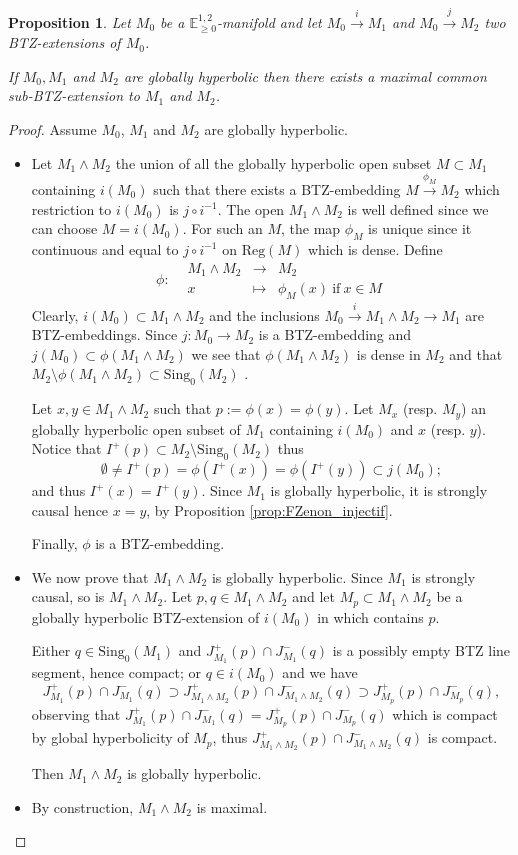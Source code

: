 \documentclass[a4paper,12pt]{article}
\def\sing{\mathrm{Sing}}
\newcommand{\mass}[1]{{\mathbb E}^{1,2}_{#1}}
\def\Reg{\mathrm{Reg}}
\def\pgcd{M_1\wedge M_2}
\def\reg{\Reg}
\newcommand{\fonction}[5]{\displaystyle#1:\begin{array}{l|rcl}
& \displaystyle #2 & \longrightarrow & \displaystyle #3 \\
    & \displaystyle #4 & \longmapsto & \displaystyle #5 \end{array}}
\newtheorem{propou}[lemou]{Proposition}
\begin{document}
		\begin{propou}\label{btzprop:pgcd}\label{prop:pgcd} Let $M_0$ be a $\mass{\geq0}$-manifold and let $M_0\xrightarrow{i} M_1$ and $M_0 \xrightarrow{j} M_2$
			two BTZ-extensions  of $M_0$. 

			If $M_0,M_1$ and $M_2$ are globally hyperbolic then there exists a maximal common sub-BTZ-extension to
			$M_1$ and $M_2$.
		\end{propou}
		
	
		\begin{proof} Assume $M_0$, $M_1$ and $M_2$ are globally hyperbolic.
		\begin{itemize}
			\item Let $\pgcd$ the union of all the globally hyperbolic open subset $M\subset M_1$ containing $i(M_0)$ such that there exists a BTZ-embedding $M\xrightarrow{\phi_M} M_2$ which restriction to $i(M_0)$ is $j\circ i^{-1}$. The open $M_1\wedge M_2$ is well defined since we can choose $M=i(M_0)$.
				For such an $M$, the map $\phi_M$ is unique since it continuous and equal to $j\circ i^{-1}$ on $\reg(M)$ which is dense. Define $$\fonction{\phi}{\pgcd}{M_2}{x}{\phi_M(x) \mathrm{~if~} x \in M}$$
				Clearly, $i(M_0)\subset \pgcd$ and the inclusions $M_0\xrightarrow{i}\pgcd \rightarrow M_1$ are BTZ-embeddings.
				Since $j: M_0 \rightarrow M_2$ is a BTZ-embedding and $j(M_0)\subset \phi(\pgcd)$  we see that $\phi(\pgcd)$ is dense in $M_2$ and that $M_2\setminus\phi(\pgcd) \subset \sing_0(M_2)$  .
				
				Let $x,y \in \pgcd$ such that $p:=\phi(x)=\phi(y)$.
				Let $M_x$ (resp. $M_y$) an globally hyperbolic open subset of $M_1$ containing $i(M_0)$ and $x$ (resp. $y$).
				Notice that $I^+(p)\subset M_2\setminus\sing_0(M_2)$ thus
				$$\emptyset\neq I^+(p)=\phi(I^+(x))=\phi(I^+(y))\subset j(M_0);$$
				and thus $I^+(x)=I^+(y)$. Since $M_1$ is globally hyperbolic, it is strongly causal hence $x=y$, by Proposition \ref{prop:FZenon_injectif}.
				
				Finally, $\phi$ is a  BTZ-embedding.
			
				
			\item 	We now prove that $M_1 \wedge M_2$ is globally hyperbolic. Since $M_1$ is strongly causal, so is $\pgcd$. Let $p, q \in M_1 \wedge M_2$ and let $M_p\subset M_1 \wedge M_2$ be a globally hyperbolic BTZ-extension of $i(M_0)$ in  which contains $p$.
			
			Either $q \in \sing_0(M_1)$ and
					$J^+_{M_1}(p)\cap J^-_{M_1}(q)$ is a possibly empty BTZ line segment, hence compact; or $q\in i(M_0)$ and we have $$J^+_{M_1}(p)\cap J^-_{M_1}(q) \supset J^+_{\pgcd}(p)\cap J^-_{\pgcd}(q)\supset J^+_{M_p}(p)\cap J^-_{M_p}(q),$$
					observing that 
					$J^+_{M_1}(p)\cap J^-_{M_1}(q) = J^+_{M_p}(p)\cap J^-_{M_p}(q)$ which is compact by global hyperbolicity of $M_p$, thus $J^+_{\pgcd}(p)\cap J^-_{\pgcd}(q)$ is compact.
					
					
					
				Then $M_1\wedge M_2$ is globally hyperbolic.
				
				
			\item By construction, $\pgcd$ is maximal.
		\end{itemize}
      \end{proof}
\end{document}
